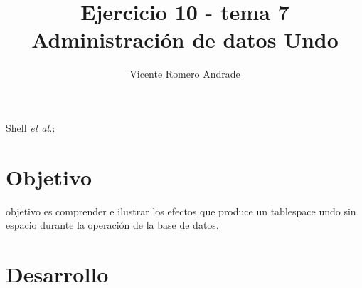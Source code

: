 \documentclass[journal]{IEEEtran}
\begin{document}
\title{Ejercicio 10 - tema 7 \\ Administración de datos Undo}
%
\author{Vicente Romero Andrade}

%
{Shell \MakeLowercase{\textit{et al.}}: }

\maketitle


\IEEEpeerreviewmaketitle

\section{Objetivo}

 objetivo es comprender e ilustrar los efectos que 
produce un tablespace undo sin espacio durante la operación de la base de datos.

\section{Desarrollo}
\end{document}
